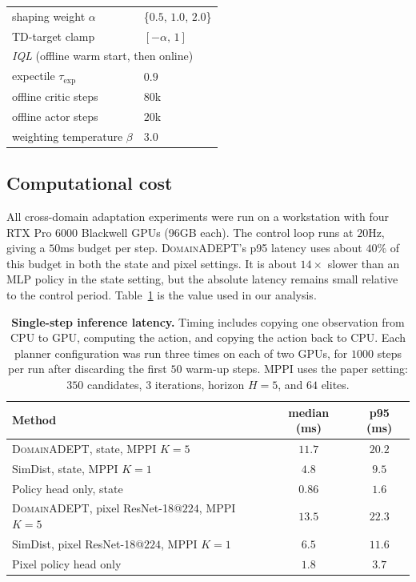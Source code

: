 \documentclass{article} %
\newcommand{\DomainADEPT}{\textsc{DomainADEPT}\xspace}
\begin{document}
\begin{table}[h]
\begin{tabular}{ll}
\midrule
shaping weight $\alpha$           & \{$0.5$, $1.0$, $2.0$\}  \\
TD-target clamp                   & $[-\alpha,\,1]$ \\
\midrule
\multicolumn{2}{l}{\emph{IQL} (offline warm start, then online)} \\
\midrule
expectile $\tau_{\text{exp}}$     & $0.9$ \\
offline critic steps              & $80$k \\
offline actor steps               & $20$k \\
weighting temperature $\beta$ & $3.0$ \\
\bottomrule
\end{tabular}
\end{table}

\subsection{Computational cost}
\label{app:compute}

All cross-domain adaptation experiments were run on a workstation with four RTX Pro 6000 Blackwell GPUs (96GB each). The control loop runs at $20$Hz, giving a $50$ms budget per step. \DomainADEPT's p95 latency uses about $40\%$ of this budget in both the state and pixel settings. It is about $14\times$ slower than an MLP policy in the state setting, but the absolute latency remains small relative to the control period. Table~\ref{tab:app-inference-latency} is the value used in our analysis.

\begin{table}[h]
\centering
\caption{%
  \textbf{Single-step inference latency.} Timing includes copying one
  observation from CPU to GPU, computing the action, and copying the action back
  to CPU. Each planner configuration was run three times on each of two GPUs,
  for $1000$ steps per run after discarding the first $50$ warm-up steps. MPPI
  uses the paper setting: $350$ candidates, $3$ iterations, horizon $H=5$, and
  $64$ elites.}
\label{tab:app-inference-latency}
\small
\begin{tabular}{lcc}
\toprule
Method & median (ms) & p95 (ms) \\
\midrule
\DomainADEPT, state, MPPI $K=5$ & $11.7$ & $20.2$ \\
SimDist, state, MPPI $K=1$ & $4.8$ & $9.5$ \\
Policy head only, state & $0.86$ & $1.6$ \\
\DomainADEPT, pixel ResNet-18@$224$, MPPI $K=5$ & $13.5$ & $22.3$ \\
SimDist, pixel ResNet-18@$224$, MPPI $K=1$ & $6.5$ & $11.6$ \\
Pixel policy head only & $1.8$ & $3.7$ \\
\bottomrule
\end{tabular}
\end{table}
\end{document}
